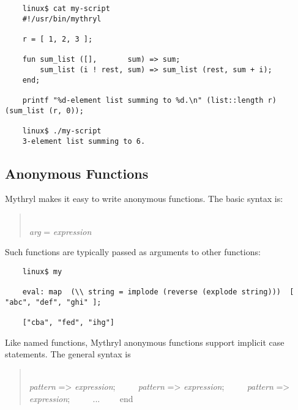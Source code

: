 \begin{verbatim}
    linux$ cat my-script
    #!/usr/bin/mythryl

    r = [ 1, 2, 3 ];

    fun sum_list ([],       sum) => sum;
        sum_list (i ! rest, sum) => sum_list (rest, sum + i);
    end;

    printf "%d-element list summing to %d.\n" (list::length r) (sum_list (r, 0));

    linux$ ./my-script
    3-element list summing to 6.
\end{verbatim}


\cutend*



\subsection{Anonymous Functions}
\label{section:ref:functions:anonymous-functions}

Mythryl makes it easy to write anonymous functions.
The basic syntax is:

\begin{quotation}
~~~~\\ {\it arg} = {\it expression} 
\end{quotation}

Such functions are typically 
passed as arguments to other functions:

\begin{verbatim}
    linux$ my

    eval: map  (\\ string = implode (reverse (explode string)))  [ "abc", "def", "ghi" ];

    ["cba", "fed", "ihg"]
\end{verbatim}

Like named functions, Mythryl anonymous functions support implicit case 
statements.  The general syntax is

\begin{quotation}
~~~~\\ {\it pattern} => {\it expression}; \newline
~~~~   {\it pattern} => {\it expression};  \newline
~~~~   {\it pattern} => {\it expression}; \newline
~~~~   ... \newline
~~~~end
\end{quotation}

